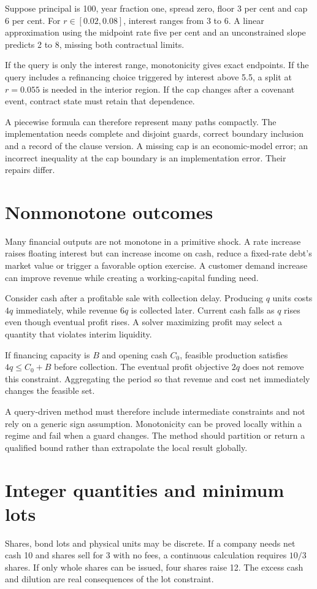 Suppose principal is 100, year fraction one, spread zero, floor 3 per cent and cap 6 per cent. For $r\in[0.02,0.08]$, interest ranges from 3 to 6. A linear approximation using the midpoint rate five per cent and an unconstrained slope predicts 2 to 8, missing both contractual limits.

If the query is only the interest range, monotonicity gives exact endpoints. If the query includes a refinancing choice triggered by interest above 5.5, a split at $r=0.055$ is needed in the interior region. If the cap changes after a covenant event, contract state must retain that dependence.

A piecewise formula can therefore represent many paths compactly. The implementation needs complete and disjoint guards, correct boundary inclusion and a record of the clause version. A missing cap is an economic-model error; an incorrect inequality at the cap boundary is an implementation error. Their repairs differ.

\section{Nonmonotone outcomes}
Many financial outputs are not monotone in a primitive shock. A rate increase raises floating interest but can increase income on cash, reduce a fixed-rate debt's market value or trigger a favorable option exercise. A customer demand increase can improve revenue while creating a working-capital funding need.

Consider cash after a profitable sale with collection delay. Producing $q$ units costs $4q$ immediately, while revenue $6q$ is collected later. Current cash falls as $q$ rises even though eventual profit rises. A solver maximizing profit may select a quantity that violates interim liquidity.

If financing capacity is $B$ and opening cash $C_0$, feasible production satisfies $4q\leq C_0+B$ before collection. The eventual profit objective $2q$ does not remove this constraint. Aggregating the period so that revenue and cost net immediately changes the feasible set.

A query-driven method must therefore include intermediate constraints and not rely on a generic sign assumption. Monotonicity can be proved locally within a regime and fail when a guard changes. The method should partition or return a qualified bound rather than extrapolate the local result globally.

\section{Integer quantities and minimum lots}
Shares, bond lots and physical units may be discrete. If a company needs net cash 10 and shares sell for 3 with no fees, a continuous calculation requires $10/3$ shares. If only whole shares can be issued, four shares raise 12. The excess cash and dilution are real consequences of the lot constraint.

